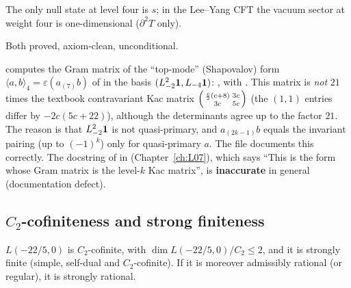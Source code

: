 \begin{physics}
The only null state at level four is $s$; in the Lee--Yang CFT the vacuum sector at weight four is
one-dimensional ($\partial^2T$ only).
\end{physics}

\begin{status}
Both proved, axiom-clean, unconditional.
\end{status}

\begin{warning}[title={Two different level-four forms}]\label{l19:warn:shap}
 computes the Gram matrix of the ``top-mode'' (Shapovalov) form
$\langle a,b\rangle_4 = \varepsilon(a_{(7)}b)$ of  in the basis
$(L_{-2}^2\mathbf{1},L_{-4}\mathbf{1})$:
, with
. This matrix is \emph{not} $21$
times the textbook contravariant Kac matrix $\begin{psmallmatrix}\frac c2(c+8)&3c\\3c&5c\end{psmallmatrix}$
(the $(1,1)$ entries differ by $-2c(5c+22)$), although the determinants agree up to the factor $21$. The
reason is that $L_{-2}^2\mathbf{1}$ is not quasi-primary, and $a_{(2k-1)}b$ equals the invariant pairing (up to
$(-1)^k$) only for quasi-primary $a$. The file documents this correctly. The docstring of
 in  (Chapter~\ref{ch:L07}), which says
``This is the form whose Gram matrix is the level-$k$ Kac matrix'', is \textbf{inaccurate} in general
(documentation defect).
\end{warning}

\subsection{\texorpdfstring{$C_2$}{C2}-cofiniteness and strong finiteness}

\begin{theorem}\label{l19:thm:lysf}
$L(-22/5,0)$ is $C_2$-cofinite, with $\dim L(-22/5,0)/C_2 \le 2$, and it is strongly finite (simple,
self-dual and $C_2$-cofinite). If it is moreover admissibly rational (or regular), it is strongly rational.
\end{theorem}

